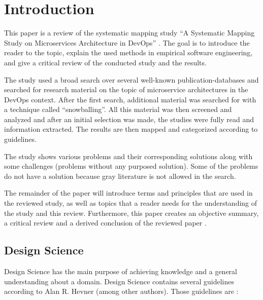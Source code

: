 \section{Introduction}
\label{sec:introduction}

This paper is a review of the systematic mapping study
``A Systematic Mapping Study on Microservices Architecture in DevOps'' \cite{waseem:SMSMSADevOps}.
The goal is to introduce the reader to the topic, explain the used
methods in empirical software engineering, and give a critical review
of the conducted study and the results.

The study used a broad search over several well-known publication-databases
and searched for research material on the topic of microservice architectures
in the DevOps context. After the first search, additional material
was searched for with a technique called ``snowballing''. All this material
was then screened and analyzed and after an initial selection was made,
the studies were fully read and information extracted. The results
are then mapped and categorized according to guidelines.

The study shows various problems and their corresponding solutions
along with some challenges (problems without any purposed solution).
Some of the problems do not have a solution because gray literature is
not allowed in the search.

The remainder of the paper will introduce terms and principles that are used
in the reviewed study, as well as topics that a reader needs for the understanding
of the study and this review. Furthermore, this paper creates an objective summary,
a critical review and a derived conclusion of the reviewed paper \cite{waseem:SMSMSADevOps}.

\subsection{Design Science}

Design Science has the main purpose of achieving knowledge and a general understanding
about a domain. Design Science contains several guidelines
according to Alan R. Hevner (among other authors). Those guidelines are \cite{hevner:DesignScience}:

